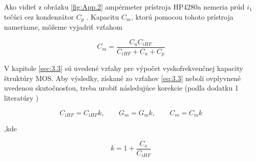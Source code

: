 Ako vidieť z obrázku \ref{fig:App.2} ampérmeter prístroja HP4280a
nemeria prúd $i_1$ tečúci cez kondenzátor $C_p$ . Kapacitu $C_m$,
ktorú pomocou tohoto prístroja nameriame, môžeme vyjadriť vzťahom

\begin{equation}\label{eq:E.6}
C_m = \frac{C_{u} C_{iHF}} {C_{iHF}+C_{u}+C_{p}}
\end{equation}

V kapitole \ref{sec:3.3} sú uvedené vzťahy pre výpočet
vyskofrekvenčnej kapacity štruktúry MOS.  Aby výsledky, získané zo
vzťahov \ref{eq:3.3} neboli ovplyvnené uvedenou skutočnosťou, treba
urobiť následujúce korekcie (podľa dodatku 1 literatúry \cite{App.4})

\begin{equation}\label{eq:E.7}
C_{iHF}=C_{iHF}k, \qquad G_{m}=G_{m}k, \qquad C_{m}=C_{m}k
\end{equation}

,kde

\begin{equation}\label{eq:E.8}
k = 1 + \frac{C_x}{C_{iHF}}
\end{equation}
